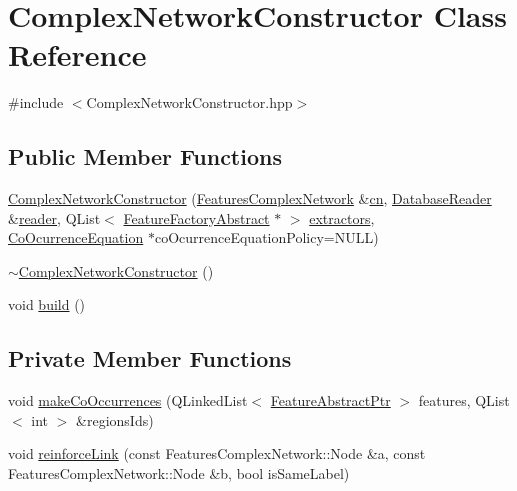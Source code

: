 \hypertarget{class_complex_network_constructor}{\section{Complex\+Network\+Constructor Class Reference}
\label{class_complex_network_constructor}
}


{\ttfamily \#include $<$Complex\+Network\+Constructor.\+hpp$>$}

\subsection*{Public Member Functions}
\begin{DoxyCompactItemize}
\item 
\hyperlink{class_complex_network_constructor_a10da7003e46cb43db8f284470b3d493b}{Complex\+Network\+Constructor} (\hyperlink{class_features_complex_network}{Features\+Complex\+Network} \&\hyperlink{class_complex_network_constructor_aa099456a58edc5c1885323061206b3e6}{cn}, \hyperlink{class_database_reader}{Database\+Reader} \&\hyperlink{class_complex_network_constructor_ad223ad7e464ff159d91a89deb4e943cc}{reader}, Q\+List$<$ \hyperlink{class_feature_factory_abstract}{Feature\+Factory\+Abstract} $\ast$ $>$ \hyperlink{class_complex_network_constructor_ae79b538a8b9253cd71de5fef1be1c18a}{extractors}, \hyperlink{class_co_ocurrence_equation}{Co\+Ocurrence\+Equation} $\ast$co\+Ocurrence\+Equation\+Policy=N\+U\+L\+L)
\item 
\hyperlink{class_complex_network_constructor_aef380b5364cb293471de5ab8a710e2db}{$\sim$\+Complex\+Network\+Constructor} ()
\item 
void \hyperlink{class_complex_network_constructor_a19d313488e2c19172e362b521f53e329}{build} ()
\end{DoxyCompactItemize}
\subsection*{Private Member Functions}
\begin{DoxyCompactItemize}
\item 
void \hyperlink{class_complex_network_constructor_acfcdef7c4ba88191a98d2e94c456a371}{make\+Co\+Occurrences} (Q\+Linked\+List$<$ \hyperlink{class_feature_abstract_ptr}{Feature\+Abstract\+Ptr} $>$ features, Q\+List$<$ int $>$ \&regions\+Ids)
\item 
void \hyperlink{class_complex_network_constructor_ad92ef615d6881fa178124b424deff23d}{reinforce\+Link} (const Features\+Complex\+Network\+::\+Node \&a, const Features\+Complex\+Network\+::\+Node \&b, bool is\+Same\+Label)
\end{DoxyCompactItemize}
